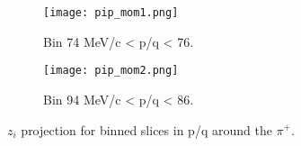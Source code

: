 \begin{figure}[!htb]
    \centering
    \begin{subfigure}[t]{0.49\textwidth}
        \centering
        \texttt{[image: pip\_mom1.png]}
        \caption{Bin 74 MeV/c < p/q < 76. } \label{fig:pipmom1}
    \end{subfigure}
    \hfill
    \begin{subfigure}[t]{.49\textwidth}
        \centering
        \texttt{[image: pip\_mom2.png]} 
        \caption{Bin 94 MeV/c < p/q < 86.} \label{fig:pipmom2}
    \end{subfigure}
  
    \caption{$z_i$ projection for binned slices in p/q around the $\pi^+$.}
\label{fig:pipmom_flat}
\end{figure}
